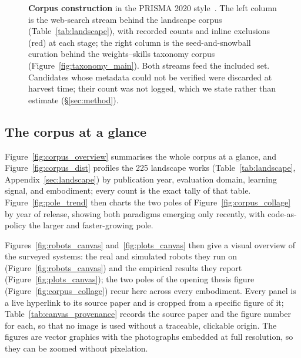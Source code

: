 \PassOptionsToPackage{svgnames,dvipsnames}{xcolor} \documentclass[acmsmall,screen,nonacm]{acmart}
\begin{document}
\begin{figure}[t]
{\begin{tikzpicture}
\end{tikzpicture}}
\caption{\textbf{Corpus construction} in the PRISMA 2020 style~\citep{prisma2020}. The left column
is the web-search stream behind the landscape corpus (Table~\ref{tab:landscape}), with recorded
counts and inline exclusions (red) at each stage; the right column is the seed-and-snowball
curation behind the weights--skills taxonomy corpus (Figure~\ref{fig:taxonomy_main}). Both streams feed the
included set. Candidates whose metadata could not be verified were discarded at harvest time; their
count was not logged, which we state rather than estimate (\S\ref{sec:method}).}
\label{fig:prisma}
\end{figure}
 
\subsection{The corpus at a glance}
\label{sec:corpus_gallery}

Figure~\ref{fig:corpus_overview} summarises the whole corpus at a glance, and
Figure~\ref{fig:corpus_dist} profiles the 225 landscape works (Table~\ref{tab:landscape},
Appendix~\ref{sec:landscape}) by publication year, evaluation domain, learning signal, and
embodiment; every count is the exact tally of that table. Figure~\ref{fig:pole_trend} then charts the
two poles of Figure~\ref{fig:corpus_collage} by year of release, showing both paradigms emerging only
recently, with code-as-policy the larger and faster-growing pole.

Figures~\ref{fig:robots_canvas} and~\ref{fig:plots_canvas} then give a visual overview of the surveyed
systems: the real and simulated robots they run on (Figure~\ref{fig:robots_canvas}) and the empirical
results they report (Figure~\ref{fig:plots_canvas}); the two poles of the opening thesis figure
(Figure~\ref{fig:corpus_collage}) recur here across every embodiment. Every panel is a live hyperlink
to its source paper and is cropped from a specific figure of it; Table~\ref{tab:canvas_provenance}
records the source paper and the figure number for each, so that no image is used without a
traceable, clickable origin. The figures are vector graphics with the photographs embedded at full
resolution, so they can be zoomed without pixelation.
\end{document}
